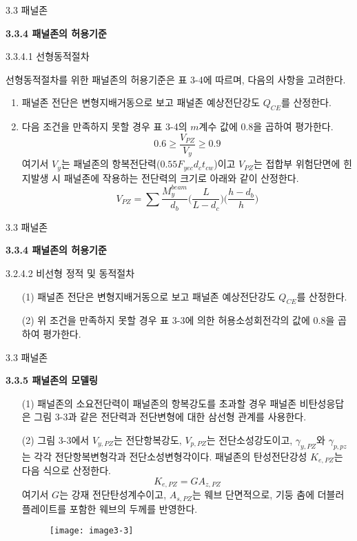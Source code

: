 	

	\begin{frame}{3.3 패널존}

	\textbf{3.3.4 패널존의 허용기준}

3.3.4.1 선형동적절차

선형동적절차를 위한 패널존의 허용기준은 표 3-4에 따르며, 다음의 사항을 고려한다. 

	\begin{enumerate}[label=\large\protect\textcircled{\small\arabic*}]
		\item 패널존 전단은 변형지배거동으로 보고 패널존 예상전단강도 $Q_{CE}$를 산정한다. 
		\item 다음 조건을 만족하지 못할 경우 표 3-4의 $m$계수 값에 0.8을 곱하여 평가한다. 
		\[0.6 \geq \frac{V_{PZ}}{V_y} \geq 0.9\]
		\noindent 여기서 $V_y$는 패널존의 항복전단력($0.55F_{yec}d_ct_{cw}$)이고 $V_{PZ}$는 접합부 위험단면에 힌지발생 시 패널존에 작용하는 전단력의 크기로 아래와 같이 산정한다. 
		\[V_{PZ} = \sum \frac{M_y^{beam}}{d_b}\Big(\frac{L}{L-d_c}\Big)\Big(\frac{h - d_b}{h}\Big)\]
	\end{enumerate}		
	
	\end{frame}
	
	\begin{frame}{3.3 패널존}

	\textbf{3.3.4 패널존의 허용기준}
		
3.2.4.2 비선형 정적 및 동적절차	

	\begin{enumerate}
		\item[(1)] 패널존 전단은 변형지배거동으로 보고 패널존 예상전단강도 $Q_{CE}$를 산정한다.   
		\item[(2)] 위 조건을 만족하지 못할 경우 표 3-3에 의한 허용소성회전각의 값에 0.8을 곱하여 평가한다.  
	\end{enumerate}
\end{frame}	
	
	
	
	\begin{frame}{3.3 패널존}

	\textbf{3.3.5 패널존의 모델링}
	
	\begin{enumerate}
		\item[(1)] 패널존의 소요전단력이 패널존의 항복강도를 초과할 경우 패널존 비탄성응답은 그림 3-3과 같은 전단력과 전단변형에 대한 삼선형 관계를 사용한다. 
		\item[(2)] 그림 3-3에서 $V_{y,PZ}$는 전단항복강도, $V_{p,PZ}$는 전단소성강도이고, $\gamma_{y,PZ}$와 $\gamma_{p,pz}$는 각각 전단항복변형각과 전단소성변형각이다. 패널존의 탄성전단강성 $K_{e,PZ}$는 다음 식으로 산정한다. 
		\[K_{e,PZ} = GA_{z,PZ}\]
		\noindent 여기서 $G$는 강재 전단탄성계수이고, $A_{s,PZ}$는 웨브 단면적으로, 기둥 춤에 더블러플레이트를 포함한 웨브의 두께를 반영한다. 
		\begin{figure}
			\centering
			\texttt{[image: image3-3]}
		\end{figure}		
	\end{enumerate}
	\end{frame}
	
